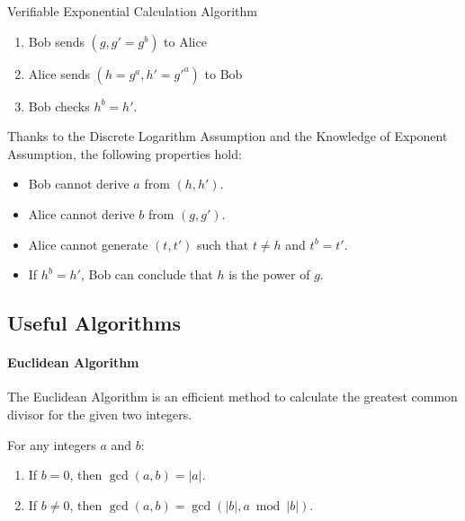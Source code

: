 \documentclass{article}
\begin{document}
\begin{protocol}{Verifiable Exponential Calculation Algorithm}{}
    \begin{enumerate}
    \item Bob sends $(g, g'=g^{b})$ to Alice
    \item Alice sends $(h=g^{a}, h'=g'^{a})$ to Bob
    \item Bob checks $h^{b} = h'$.
\end{enumerate}
\end{protocol}

Thanks to the Discrete Logarithm Assumption and the Knowledge of Exponent Assumption, the following properties hold:
\begin{itemize}
\item Bob cannot derive $a$ from $(h, h')$.
\item Alice cannot derive $b$ from $(g, g')$.
\item Alice cannot generate $(t, t')$ such that $t \neq h$ and $t^{b} = t'$.  
\item If $h^{b} = h'$, Bob can conclude that $h$ is the power of $g$.
\end{itemize}

\subsection{Useful Algorithms}

\paragraph{Euclidean Algorithm}

The Euclidean Algorithm is an efficient method to calculate the greatest common divisor for the given two integers.

\begin{theorem}{}{}
For any integers $a$ and $b$:
\begin{enumerate}
\item If $b = 0$, then $\gcd(a, b) = |a|$.
\item If $b \neq 0$, then $\gcd(a, b) = \gcd(|b|, a \bmod |b|)$.
\end{enumerate}
\end{theorem}
\end{document}
